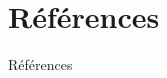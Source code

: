 \documentclass[8pt]{beamer}
\begin{document}

	\section{Références}
	\begin{frame}[allowframebreaks]{Références}
		\nocite{sklearn_api}
		
		
	\end{frame}
\end{document}
